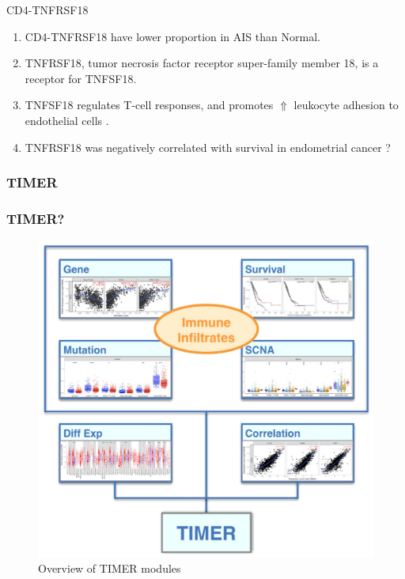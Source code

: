 \documentclass{beamer}
\begin{document}
\begin{frame}[allowframebreaks]
        \begin{block}{CD4-TNFRSF18}
            \begin{enumerate}
                \item CD4-TNFRSF18 have lower proportion in AIS than Normal.
                \item TNFRSF18, tumor necrosis factor receptor super-family member 18, is a receptor for TNFSF18.
                \item TNFSF18 regulates T-cell responses, and promotes $\Uparrow$ leukocyte adhesion to endothelial cells \cite{TNFRSF18-1}.
                \item TNFRSF18 was negatively correlated with survival in endometrial cancer \cite{TNFRSF18-2}?
            \end{enumerate}
        \end{block}
    \end{frame}

    \subsubsection{TIMER}
    \begin{frame}
        \frametitle{TIMER?}

        \begin{figure}
            \includegraphics[width=0.5 \linewidth]{figures/Workflow/TIMER.jpg}
            \caption{Overview of TIMER modules \protect\cite{TIMER-1}}
        \end{figure}
    \end{frame}
\end{document}
